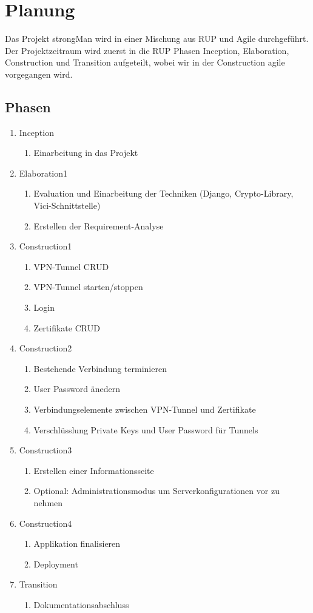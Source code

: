 \section{Planung}
Das Projekt strongMan wird in einer Mischung aus \Gls{RUP} und Agile durchgeführt. Der Projektzeitraum wird zuerst in die RUP Phasen Inception, Elaboration, Construction und Transition aufgeteilt, wobei wir in der Construction agile vorgegangen wird.

\subsection{Phasen}
\begin{enumerate}
  \item Inception
  \begin{enumerate}
    \item Einarbeitung in das Projekt
  \end{enumerate}
  \item Elaboration1
  \begin{enumerate}
    \item Evaluation und Einarbeitung der Techniken (Django, Crypto-Library, Vici-Schnittstelle)
    \item Erstellen der Requirement-Analyse
  \end{enumerate}
  \item Construction1
  \begin{enumerate}
    \item VPN-Tunnel CRUD
    \item VPN-Tunnel starten/stoppen
    \item Login 
    \item Zertifikate CRUD
  \end{enumerate}
  \item Construction2
  \begin{enumerate}
    \item Bestehende Verbindung terminieren
    \item User Password änedern 
    \item Verbindungselemente zwischen VPN-Tunnel und Zertifikate
    \item Verschlüsslung Private Keys und User Password für Tunnels
  \end{enumerate}
    \item Construction3
  \begin{enumerate}
  	\item Erstellen einer Informationsseite
    \item Optional: Administrationsmodus um Serverkonfigurationen vor zu nehmen
  \end{enumerate}
      \item Construction4
  \begin{enumerate}
    \item Applikation finalisieren
    \item Deployment
  \end{enumerate}
  \item Transition
  \begin{enumerate}
    \item Dokumentationsabschluss
  \end{enumerate}
\end{enumerate}
\newpage






